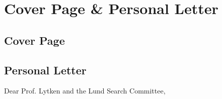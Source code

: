 \chapter{Cover Page \& Personal Letter}

\section{Cover Page} \label{sec:cover-page}
\noindent{}%

\clearpage
\section{Personal Letter} \label{sec:personal-letter}

\noindent Dear Prof. Lytken and the Lund Search Committee, \hfill {}
\vspace{1em}

